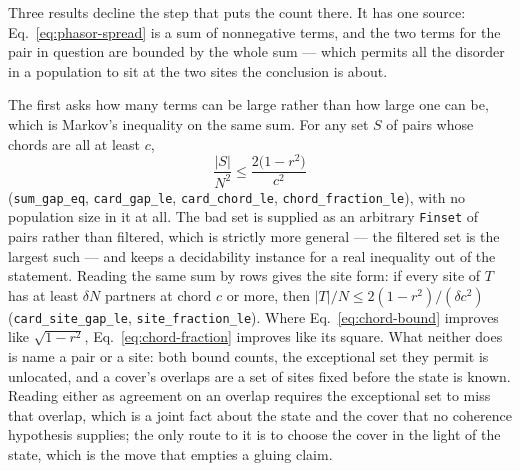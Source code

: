 \documentclass{article}
\begin{document}
Three results decline the step that puts the count there. It has one source:
Eq.~\eqref{eq:phasor-spread} is a sum of nonnegative terms, and the two terms
for the pair in question are bounded by the whole sum --- which permits all the
disorder in a population to sit at the two sites the conclusion is about.

The first asks how many terms can be large rather than how large one can be,
which is Markov's inequality on the same sum. For any set $S$ of pairs whose
chords are all at least $c$,
\begin{equation}
 \frac{|S|}{N^{2}}\le\frac{2\bigl(1-r^{2}\bigr)}{c^{2}}
 \label{eq:chord-fraction}
\end{equation}
(\nolinkurl{sum_gap_eq}, \nolinkurl{card_gap_le},
\nolinkurl{card_chord_le},
\nolinkurl{chord_fraction_le}), with no population size
in it at all. The bad set is supplied as an arbitrary \texttt{Finset} of pairs
rather than filtered, which is strictly more general --- the filtered set is the
largest such --- and keeps a decidability instance for a real inequality out of
the statement. Reading the same sum by rows gives the site form: if every site
of $T$ has at least $\delta N$ partners at chord $c$ or more, then
$|T|/N\le2(1-r^{2})/(\delta c^{2})$
(\nolinkurl{card_site_gap_le},
\nolinkurl{site_fraction_le}). Where
Eq.~\eqref{eq:chord-bound} improves like $\sqrt{1-r^{2}}$,
Eq.~\eqref{eq:chord-fraction} improves like its square. What neither does is
name a pair or a site: both bound counts, the exceptional set they permit is
unlocated, and a cover's overlaps are a set of sites fixed before the state is
known. Reading either as agreement on an overlap requires the exceptional set to
miss that overlap, which is a joint fact about the state and the cover that no
coherence hypothesis supplies; the only route to it is to choose the cover in
the light of the state, which is the move that empties a gluing claim.
\end{document}
